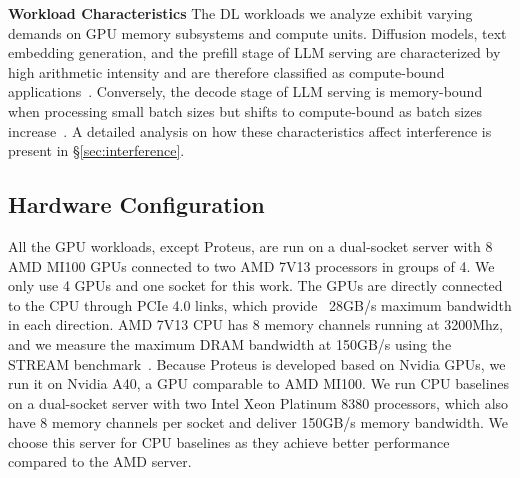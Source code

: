 
\noindent
\textbf{Workload Characteristics}
The DL workloads we analyze exhibit varying demands on GPU memory subsystems and compute units. 
Diffusion models, text embedding generation, and the prefill stage of LLM serving are characterized by high arithmetic intensity and are therefore classified as compute-bound applications~\cite{golden2024generativeaillmsimplications, zhao2024prepackingsimplemethodfast}. 
Conversely, the decode stage of LLM serving is memory-bound when processing small batch sizes but shifts to compute-bound as batch sizes increase~\cite{zhang2024flattenquantbreakinginferencecomputebound}. 
A detailed analysis on how these characteristics affect interference is present in \S\ref{sec:interference}.

\subsection{Hardware Configuration}
All the GPU workloads, except Proteus, are run on a dual-socket server with 8 AMD MI100 GPUs connected to two AMD 7V13 processors in groups of 4.
We only use 4 GPUs and one socket for this work.
The GPUs are directly connected to the CPU through PCIe 4.0 links, which provide ~28GB/s maximum bandwidth in each direction.
AMD 7V13 CPU has 8 memory channels running at 3200Mhz, and we measure the maximum DRAM bandwidth at 150GB/s using the STREAM benchmark~\cite{stream-benchmark}.
Because Proteus is developed based on Nvidia GPUs, we run it on Nvidia A40, a GPU comparable to AMD MI100.
We run CPU baselines on a dual-socket server with two Intel Xeon Platinum 8380 processors, which also have 8 memory channels per socket and deliver 150GB/s memory bandwidth.
We choose this server for CPU baselines as they achieve better performance compared to the AMD server.


